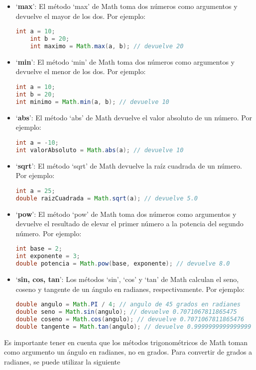 \documentclass{article}
\begin{document}
\begin{itemize}
    \item \enquote*{\textbf{max}}: El método \enquote*{max} de Math toma dos números como argumentos y devuelve el mayor de los dos. Por ejemplo:
    \begin{lstlisting}[language=Java]
    int a = 10;
    int b = 20;
    int maximo = Math.max(a, b); // devuelve 20
    \end{lstlisting}
    \item \enquote*{\textbf{min}}: El método \enquote*{min} de Math toma dos números como argumentos y devuelve el menor de los dos. Por ejemplo:
\begin{lstlisting}[language=Java]
int a = 10;
int b = 20;
int minimo = Math.min(a, b); // devuelve 10
\end{lstlisting}

\item \enquote*{\textbf{abs}}: El método \enquote*{abs} de Math devuelve el valor absoluto de un número. Por ejemplo:
\begin{lstlisting}[language=Java]
int a = -10;
int valorAbsoluto = Math.abs(a); // devuelve 10
\end{lstlisting}

\item \enquote*{\textbf{sqrt}}: El método \enquote*{sqrt} de Math devuelve la raíz cuadrada de un número. Por ejemplo:
\begin{lstlisting}[language=Java]
int a = 25;
double raizCuadrada = Math.sqrt(a); // devuelve 5.0
\end{lstlisting}

\item \enquote*{\textbf{pow}}: El método \enquote*{pow} de Math toma dos números como argumentos y devuelve el resultado de elevar el primer número a la potencia del segundo número. Por ejemplo:
\begin{lstlisting}[language=Java]
int base = 2;
int exponente = 3;
double potencia = Math.pow(base, exponente); // devuelve 8.0
\end{lstlisting}

\item \enquote*{\textbf{sin, cos, tan}}: Los métodos \enquote*{sin}, \enquote*{cos} y \enquote*{tan} de Math calculan el seno, coseno y tangente de un ángulo en radianes, respectivamente. Por ejemplo:
\begin{lstlisting}[language=Java]
double angulo = Math.PI / 4; // angulo de 45 grados en radianes
double seno = Math.sin(angulo); // devuelve 0.7071067811865475
double coseno = Math.cos(angulo); // devuelve 0.7071067811865476
double tangente = Math.tan(angulo); // devuelve 0.9999999999999999
\end{lstlisting}

\end{itemize}
Es importante tener en cuenta que los métodos trigonométricos de Math toman como argumento un ángulo en radianes, no en grados. Para convertir de grados a radianes, se puede utilizar la siguiente
\end{document}
